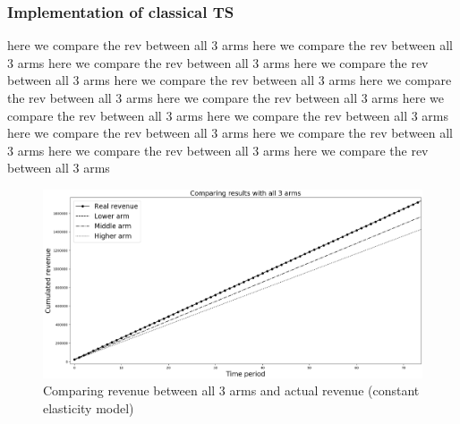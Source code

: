 \documentclass[a4paper]{article}
\begin{document}
\subsubsection{Implementation of classical TS}
here we compare the rev between all 3 arms here we compare the rev between all 3 arms here we compare the rev between all 3 arms here we compare the rev between all 3 arms here we compare the rev between all 3 arms here we compare the rev between all 3 arms here we compare the rev between all 3 arms here we compare the rev between all 3 arms here we compare the rev between all 3 arms here we compare the rev between all 3 arms here we compare the rev between all 3 arms here we compare the rev between all 3 arms here we compare the rev between all 3 arms 
\begin{figure}[h!]
	\centering
	\includegraphics[width=1.03\textwidth]{7.png}
	\caption{\label{fig:7}Comparing revenue between all 3 arms and actual revenue (constant elasticity model)}
\end{figure}
\end{document}
